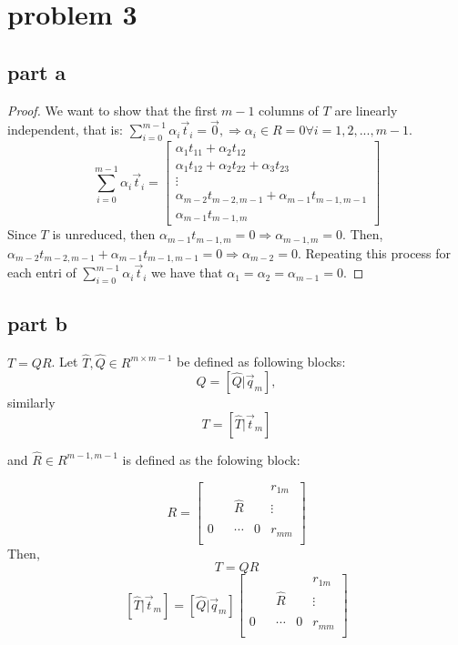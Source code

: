 \documentclass[10pt]{article}
\begin{document}
\section{problem 3}
\subsection{part a}
  \begin{proof}
  We want to show that the first $m-1$ columns of $T$ are linearly independent, that is:
  $\sum_{i=0}^{m-1} \alpha_i \vec{t}_i = \vec{0}, \Rightarrow \alpha_i \in R =0 \forall i=1,2,...,m-1$.
\[
\sum_{i=0}^{m-1} \alpha_i \vec{t}_i = 
            \begin{bmatrix}
            \alpha_1 t_{11} + \alpha_2 t_{12} \\ 
            \alpha_1 t_{12} + \alpha_2 t_{22} + \alpha_3 t_{23} \\ 
            \vdots \\
                  \alpha_{m-2} t_{m-2,m-1} + \alpha_{m-1} t_{m-1,m-1} \\ 
                  \alpha_{m-1} t_{m-1,m}
            \end{bmatrix} 
\]
Since $T$ is unreduced, then $\alpha_{m-1} t_{m-1,m} = 0 \Rightarrow  \alpha_{m-1,m} =0$. 
Then, $\alpha_{m-2} t_{m-2,m-1} + \alpha_{m-1} t_{m-1,m-1} = 0 \Rightarrow \alpha_{m-2} =0$. Repeating this 
process for each entri of $\sum_{i=0}^{m-1} \alpha_i \vec{t}_i $ we have that 
$\alpha_1 = \alpha_2 = \alpha_{m-1}=0$. 
  \end{proof}
\subsection{part b}
 $T = QR$. Let $\hat{T},\hat{Q} \in R^{m \times m-1}$ be defined as following blocks:
  \[
    Q = \left[ \hat{Q} | \vec{q}_{m} \right],
  \]
  similarly
  \[
    T = \left[ \hat{T} | \vec{t}_{m} \right]
  \]

  and $\hat{R} \in R^{m-1,m-1}$ is defined as the folowing block:

  \[
    R = 
\left[\begin{array}{cccc|c}
 & & & &r_{1m}\\
 & &\hat{R} & &\vdots\\ 
 & & & &\\ \hline
 0& &\cdots &0&r_{mm}\\  
\end{array}\right] 
  \]
Then,
\[
  T=QR
\]
\[
 \left[ \hat{T} | \vec{t}_{m} \right]=
  \left[ \hat{Q} | \vec{q}_{m} \right]
\left[\begin{array}{cccc|c}
 & & & &r_{1m}\\
 & &\hat{R} & &\vdots\\ 
 & & & &\\ \hline
 0& &\cdots &0&r_{mm}\\  
\end{array}\right] 
\]
\end{document}
